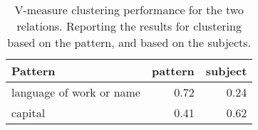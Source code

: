 \begin{table}[t]
    \centering
\begin{tabular}{lrr}
\toprule
                                          Pattern &  pattern &  subject \\
\midrule
     language of work or name &            0.72 &            0.24 \\
                      capital &            0.41 &            0.62 \\
\bottomrule
\end{tabular}

    \caption{V-measure clustering performance for the two relations. Reporting the results for clustering based on the pattern, and based on the subjects.}
    \label{tab:vmeasure-small}
\end{table}